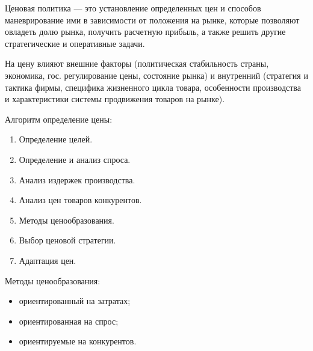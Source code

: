 \documentclass[a4paper,12pt,oneside,final]{extarticle}
\numberwithin{equation}{section}
\begin{document}
Ценовая политика --- это установление определенных цен и способов маневрирование ими в зависимости от положения на рынке, которые позволяют овладеть долю рынка, получить расчетную прибыль, а также решить другие стратегические и оперативные задачи.

На цену влияют внешние факторы (политическая стабильность страны, экономика, гос. регулирование цены, состояние рынка) и внутренний (стратегия и тактика фирмы, специфика жизненного цикла товара, особенности производства и характеристики системы продвижения товаров на рынке).

Алгоритм определение цены:
\begin{enumerate}
	\item Определение целей. 	
	\item Определение и анализ спроса. 	
	\item Анализ издержек производства. 	
	\item Анализ цен товаров конкурентов. 	
	\item Методы ценообразования. 	
	\item Выбор ценовой стратегии. 	
	\item Адаптация цен. 	
\end{enumerate}

Методы ценообразования:
\begin{itemize}
	\item ориентированный на затратах;
	\item ориентированная на спрос;
	\item ориентируемые на конкурентов.
\end{itemize}
\end{document}

